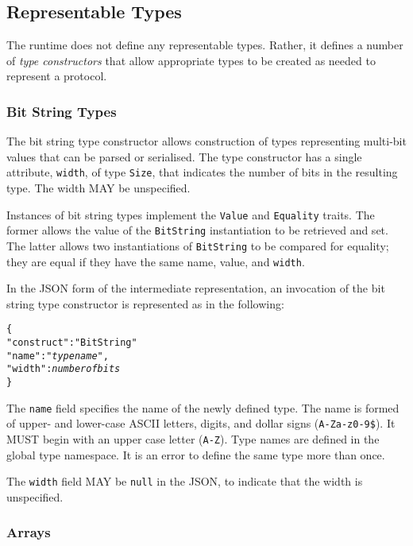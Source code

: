 \documentclass[10pt,twocolumn,a4paper]{article}
\newcommand{\code}[1]{\texttt{#1}}
\begin{document}
\subsection{Representable Types}
\label{sec:representable}

The runtime does not define any representable types. Rather, it defines
a number of \emph{type constructors} that allow appropriate types to be
created as needed to represent a protocol.

\subsubsection{Bit String Types}
\label{sec:bit-string}

The bit string type constructor allows construction of types representing
multi-bit values that can be parsed or serialised. The type constructor
has a single attribute, \code{width}, of type \code{Size}, that indicates
the number of bits in the resulting type. The width MAY be unspecified.

Instances of bit string types implement the \code{Value} and
\code{Equality} traits. The former allows the value of the \code{BitString}
instantiation to be retrieved and set. The latter allows two instantiations
of \code{BitString} to be compared for equality; they are equal if they
have the same name, value, and \code{width}.

In the JSON form of the intermediate representation, an invocation of the
bit string type constructor is represented as in the following:
\footnotesize
\begin{alltt}
  \{
    "construct"   : "BitString"
    "name"        : "\emph{type name}",
    "width"       : \emph{number of bits}
  \}
\end{alltt}
\normalsize
The \code{name} field specifies the name of the newly defined type. The
name is formed of upper- and lower-case ASCII letters, digits, and dollar
signs (\code{A-Za-z0-9\$}).  It MUST begin with an upper case letter
(\code{A-Z}). Type names are defined in the global type namespace. 
It is an error to define the same type more than once.

The \code{width} field MAY be \code{null} in the JSON, to indicate that the
width is unspecified.

\subsubsection{Arrays}
\end{document}

